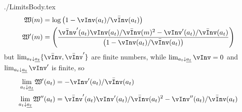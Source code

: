\newcommand{\textname}{./Appendices/Limits}\documentclass{\econtex} \newcommand{\Mma}{{\it Mathematica}}
\begin{document}
 \large 
\begin{verbatimwrite}{./LimitsBody.tex}
\newcommand{\vPF}{\bar{\vInv}}
\newcommand{\cPF}{\bar{\cFunc}}
\newcommand{\W}{\mathfrak{W}}
\newcommand{\at}{a_{t}}
\newcommand{\atDown}{\lim_{\at \downarrow \underline{\at}}}
  \begin{equation}\begin{gathered}\begin{aligned}
    \W(m)  & = \log \left(1-\vInv(\at)/\vPF(\at)\right) 
\\ \W^{\prime}(m)  & = \left(\frac{\vPF^{\prime}(\at)\vInv(\at)/\vPF(m)^2-\vInv^{\prime}(\at)/\vPF(\at)}{\left(1-\vInv(\at)/\vPF(\at)\right) }\right)
  \end{aligned}\end{gathered}\end{equation}
but $\atDown \{\vPF,\vPF^{\prime}\}$ are finite numbers, while $\atDown \vInv = 0$ and $\atDown \vInv^{\prime}$ is finite, so
  \begin{equation}\begin{gathered}\begin{aligned}
   \atDown \W^{\prime}(\at)  & = -\vInv^{\prime}(\at)/\vPF(\at)
\\ \atDown \W^{\prime\prime}(\at)  & = \vPF^{\prime}(\at)\vInv^{\prime}(\at)/\vPF(\at)^{2}-\vInv^{\prime\prime}(\at)/\vPF(\at  )
  \end{aligned}\end{gathered}\end{equation}


\end{verbatimwrite}



\end{document}
